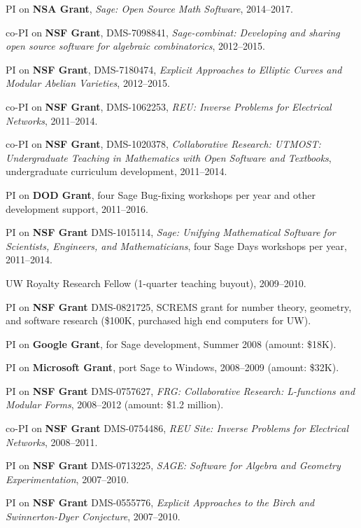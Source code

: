 \documentclass[10pt]{article}
\newcounter{totalnumgrants}
\newenvironment{grants}
   {
   \begin{revnumerate}[\value{totalnumgrants}]
   {}
         {
            \setlength{\itemsep}{.5ex}
            \setlength{\parsep}{0ex}
            \setlength{\leftmargin}{0em}
            \setlength{\parskip}{0ex}
            \setlength{\topsep}{0ex}
         }
   }
   {
\end{revnumerate}
   }
\newcommand{\marginlabel}[1]{
\begin{minipage}[b]{0.8\labelwidth}{\large \textsf{\textbf{#1}}}\end{minipage}}
\newcommand{\entrylabel}[1]{\mbox{\marginlabel{#1}}\hfill}
\newcommand{\MainListlabel}[1]
   {
      \parbox[t]{\labelwidth}{\hspace{.8em}\marginlabel{#1}}
   }
\newenvironment{MainList}[1]
   {
      \renewcommand{\entrylabel}{\MainListlabel}
      \begin{list}{}
      {
         \renewcommand{\makelabel}{\entrylabel}
         \setlength   {\itemindent}{-.65em}
         \setlength   {\labelwidth}{#1}
         \setlength   {\leftmargin}{\labelwidth}
         \setlength   {\itemsep}{3ex}
      }
   }
   {
      \end{list}
   }
\begin{document}
\begin{MainList}{88pt}
\begin{grants}
\item PI on {\bf NSA Grant}, {\em Sage: Open Source Math Software}, 2014--2017.
\item co-PI on {\bf NSF Grant}, DMS-7098841, {\em Sage-combinat: Developing and sharing open source software for algebraic combinatorics}, 2012--2015.
\item PI on {\bf NSF Grant}, DMS-7180474, {\em Explicit Approaches to Elliptic Curves and Modular Abelian Varieties}, 2012--2015.
\item co-PI on {\bf NSF Grant}, DMS-1062253, {\em REU: Inverse Problems for Electrical Networks}, 2011--2014.
\item co-PI on {\bf NSF Grant}, DMS-1020378, {\em Collaborative Research: UTMOST: Undergraduate Teaching in Mathematics with Open Software and Textbooks}, undergraduate curriculum development, 2011--2014.
\item PI on {\bf DOD Grant}, four Sage Bug-fixing workshops per year and other development support, 2011--2016.
\item PI on {\bf NSF Grant} DMS-1015114, {\em Sage: Unifying Mathematical Software for Scientists, Engineers, and Mathematicians}, four Sage Days workshops per year, 2011--2014.
\item UW Royalty Research Fellow (1-quarter teaching buyout), 2009--2010.
\item PI on {\bf NSF Grant} DMS-0821725, SCREMS grant for number
  theory, geometry, and software research (\$100K, purchased
  high end computers for UW).
\item PI on {\bf Google Grant}, for Sage development, Summer 2008 (amount: \$18K).
\item PI on {\bf Microsoft Grant}, port Sage to Windows, 2008--2009 (amount: \$32K).
\item PI on {\bf NSF Grant} DMS-0757627, {\em FRG: Collaborative Research: L-functions and Modular Forms}, 2008--2012
(amount: \$1.2 million).
\item co-PI on {\bf NSF Grant} DMS-0754486, {\em REU Site: Inverse Problems for Electrical Networks}, 2008--2011.
\item PI on {\bf NSF Grant} DMS-0713225, {\em SAGE: Software for Algebra and Geometry Experimentation}, 2007--2010.
\item PI on {\bf NSF Grant} DMS-0555776, {\em Explicit Approaches to the Birch and Swinnerton-Dyer Conjecture}, 2007--2010.

\end{grants}
\end{MainList}
\end{document}
